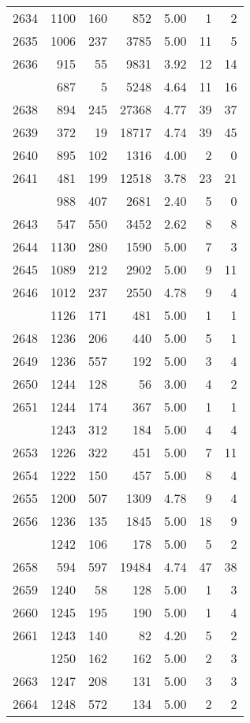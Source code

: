 \documentclass[
]{article}
\begin{document}
\begin{table}
\begin{tabular}[t]{lrrrrrr}
2634 & 1100 & 160 & 852 & 5.00 & 1 & 2\\
2635 & 1006 & 237 & 3785 & 5.00 & 11 & 5\\
2636 & 915 & 55 & 9831 & 3.92 & 12 & 14\\
\addlinespace
2637 & 687 & 5 & 5248 & 4.64 & 11 & 16\\
2638 & 894 & 245 & 27368 & 4.77 & 39 & 37\\
2639 & 372 & 19 & 18717 & 4.74 & 39 & 45\\
2640 & 895 & 102 & 1316 & 4.00 & 2 & 0\\
2641 & 481 & 199 & 12518 & 3.78 & 23 & 21\\
\addlinespace
2642 & 988 & 407 & 2681 & 2.40 & 5 & 0\\
2643 & 547 & 550 & 3452 & 2.62 & 8 & 8\\
2644 & 1130 & 280 & 1590 & 5.00 & 7 & 3\\
2645 & 1089 & 212 & 2902 & 5.00 & 9 & 11\\
2646 & 1012 & 237 & 2550 & 4.78 & 9 & 4\\
\addlinespace
2647 & 1126 & 171 & 481 & 5.00 & 1 & 1\\
2648 & 1236 & 206 & 440 & 5.00 & 5 & 1\\
2649 & 1236 & 557 & 192 & 5.00 & 3 & 4\\
2650 & 1244 & 128 & 56 & 3.00 & 4 & 2\\
2651 & 1244 & 174 & 367 & 5.00 & 1 & 1\\
\addlinespace
2652 & 1243 & 312 & 184 & 5.00 & 4 & 4\\
2653 & 1226 & 322 & 451 & 5.00 & 7 & 11\\
2654 & 1222 & 150 & 457 & 5.00 & 8 & 4\\
2655 & 1200 & 507 & 1309 & 4.78 & 9 & 4\\
2656 & 1236 & 135 & 1845 & 5.00 & 18 & 9\\
\addlinespace
2657 & 1242 & 106 & 178 & 5.00 & 5 & 2\\
2658 & 594 & 597 & 19484 & 4.74 & 47 & 38\\
2659 & 1240 & 58 & 128 & 5.00 & 1 & 3\\
2660 & 1245 & 195 & 190 & 5.00 & 1 & 4\\
2661 & 1243 & 140 & 82 & 4.20 & 5 & 2\\
\addlinespace
2662 & 1250 & 162 & 162 & 5.00 & 2 & 3\\
2663 & 1247 & 208 & 131 & 5.00 & 3 & 3\\
2664 & 1248 & 572 & 134 & 5.00 & 2 & 2\\

\end{tabular}
\end{table}
\end{document}

